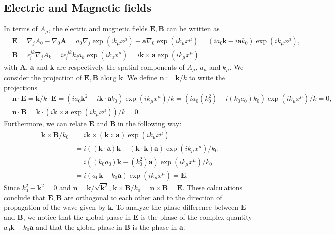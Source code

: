 \documentclass[10pt, a4paper]{article}
\begin{document}
{\subsection{Electric and Magnetic fields}
In terms of $A_\mu$, the electric and magnetic fields $\mathbf{E}, \mathbf{B}$ can be written as 
\begin{align*}
    &\mathbf{E} = \nabla_j A_0 -\nabla_0 \mathbf{A} = a_0\nabla_j\exp \left(i k_\mu x^\mu\right) - \mathbf{a} \nabla_0  \exp \left(i k_\mu x^\mu\right) = (i a_0 \mathbf{k} - i\mathbf{a} k_0)  \exp \left(i k_\mu x^\mu\right),\\
    &\mathbf{B} =  \epsilon_i^{jk} \nabla_j A_{k} = i\epsilon_i^{\ jk} k_j a_k\exp \left(i k_\mu x^\mu\right) = i\mathbf{k} \times \mathbf{a}\exp \left(i k_\mu x^\mu\right) 
\end{align*} with $\mathbf{A}$, $\mathbf{a}$ and $\mathbf{k}$ are respectively the spatial components of $A_{\mu}$, $a_{\mu}$ and $k_{\mu}$. We consider the projection of $\mathbf{E}, \mathbf{B}$ along $\mathbf{k}$. We define  $\mathbf{n} := \mathbf{k}/k$ to write the projections 
\begin{align*}
    &\mathbf{n} \cdot \mathbf{E} = \mathbf{k}/k \cdot \mathbf{E}= (i a_0 \mathbf{k}^2 - i\mathbf{k} \cdot \mathbf{a} k_0)  \exp \left(i k_\mu x^\mu\right)/k =  (i a_0 (k_0^2) - i(k_0 a_0) k_0)  \exp \left(i k_\mu x^\mu\right)/k = 0, \\
    &\mathbf{n} \cdot \mathbf{B} = \mathbf{k} \cdot \left(i\mathbf{k} \times \mathbf{a}\exp \left(i k_\mu x^\mu\right)\right)/k = 0.
\end{align*}
Furthermore, we can relate $\mathbf{E}$ and $\mathbf{B}$ in the following way:
\begin{align*}
    \mathbf{k} \times \mathbf{B}/k_0 &= i \mathbf{k} \times (\mathbf{k} \times \mathbf{a})\exp \left(i k_\mu x^\mu\right)\\ &=  i\left((\mathbf{k} \cdot \mathbf{a})\mathbf{k} - (\mathbf{k} \cdot \mathbf{k})\mathbf{a}\right)\exp \left(i k_\mu x^\mu\right)/k_0 \\
    &=  i\left((k_0 a_0)\mathbf{k} - (k_0^2)\mathbf{a}\right)\exp \left(i k_\mu x^\mu\right)/k_0\\
    &= i\left(a_0\mathbf{k} - k_0\mathbf{a}\right)\exp \left(i k_\mu x^\mu\right) = \mathbf{E}.
\end{align*}
Since $k_0^2-\mathbf{k}^2 = 0$ and $\mathbf{n} = \mathbf{k}/\sqrt{\mathbf{k}^2}$, $\mathbf{k} \times \mathbf{B}/k_0 = \mathbf{n} \times \mathbf{B} = \mathbf{E}$. These calculations conclude that $\mathbf{E}, \mathbf{B}$ are orthogonal to each other and to the direction of propagation of the wave given by $\mathbf{k}$. To analyze the phase difference between $\mathbf{E
}$ and $\mathbf{B}$,  we notice that the global phase in $\mathbf{E}$ is the phase of the complex quantity $a_0\mathbf{k} - k_0\mathbf{a}$ and that the global phase in $\mathbf{B}$ is the phase in $\mathbf{a}$. 

}
\end{document}
